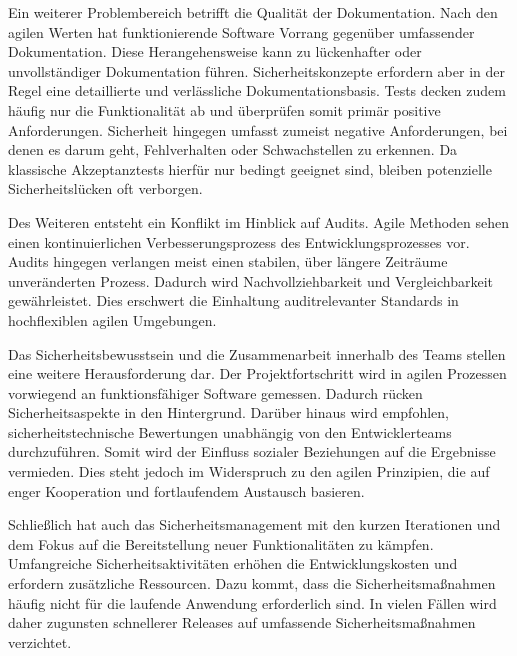 \documentclass[acmtog]{acmart}
\begin{document}
Ein weiterer Problembereich betrifft die Qualität der Dokumentation.
Nach den agilen Werten hat funktionierende Software Vorrang gegenüber umfassender Dokumentation. 
Diese Herangehensweise kann zu lückenhafter oder unvollständiger Dokumentation führen.
Sicherheitskonzepte erfordern aber in der Regel eine detaillierte und verlässliche Dokumentationsbasis.
Tests decken zudem häufig nur die Funktionalität ab und überprüfen somit primär positive Anforderungen.
Sicherheit hingegen umfasst zumeist negative Anforderungen, bei denen es darum geht, Fehlverhalten oder Schwachstellen zu erkennen.
Da klassische Akzeptanztests hierfür nur bedingt geeignet sind, bleiben potenzielle Sicherheitslücken oft verborgen. \cite{oueslati_literature_2015}

Des Weiteren entsteht ein Konflikt im Hinblick auf Audits. 
Agile Methoden sehen einen kontinuierlichen Verbesserungsprozess des Entwicklungsprozesses vor. 
Audits hingegen verlangen meist einen stabilen, über längere Zeiträume unveränderten Prozess. 
Dadurch wird Nachvollziehbarkeit und Vergleichbarkeit gewährleistet.
Dies erschwert die Einhaltung auditrelevanter Standards in hochflexiblen agilen Umgebungen. \cite{oueslati_literature_2015}

Das Sicherheitsbewusstsein und die Zusammenarbeit innerhalb des Teams stellen eine weitere Herausforderung dar.
Der Projektfortschritt wird in agilen Prozessen vorwiegend an funktionsfähiger Software gemessen.
Dadurch rücken Sicherheitsaspekte in den Hintergrund. 
Darüber hinaus wird empfohlen, sicherheitstechnische Bewertungen unabhängig von den Entwicklerteams durchzuführen. 
Somit wird der Einfluss sozialer Beziehungen auf die Ergebnisse vermieden.
Dies steht jedoch im Widerspruch zu den agilen Prinzipien, die auf enger Kooperation und fortlaufendem Austausch basieren. \cite{oueslati_literature_2015}

Schließlich hat auch das Sicherheitsmanagement mit den kurzen Iterationen und dem Fokus auf die Bereitstellung neuer Funktionalitäten zu kämpfen. 
Umfangreiche Sicherheitsaktivitäten erhöhen die Entwicklungskosten und erfordern zusätzliche Ressourcen.
Dazu kommt, dass die Sicherheitsmaßnahmen häufig nicht für die laufende Anwendung erforderlich sind.
In vielen Fällen wird daher zugunsten schnellerer Releases auf umfassende Sicherheitsmaßnahmen verzichtet. \cite{oueslati_literature_2015}
 
\end{document}
